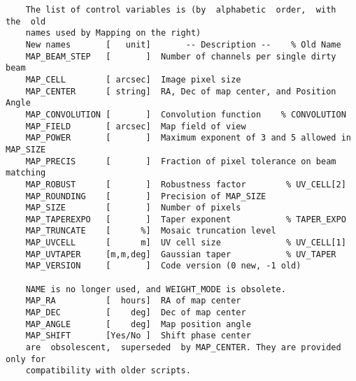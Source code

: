 \begin{verbatim}
    The list of control variables is (by  alphabetic  order,  with  the  old
    names used by Mapping on the right)
    New names       [   unit]       -- Description --    % Old Name
    MAP_BEAM_STEP   [       ]  Number of channels per single dirty beam
    MAP_CELL        [ arcsec]  Image pixel size
    MAP_CENTER      [ string]  RA, Dec of map center, and Position Angle
    MAP_CONVOLUTION [       ]  Convolution function    % CONVOLUTION
    MAP_FIELD       [ arcsec]  Map field of view
    MAP_POWER       [       ]  Maximum exponent of 3 and 5 allowed in MAP_SIZE
    MAP_PRECIS      [       ]  Fraction of pixel tolerance on beam matching
    MAP_ROBUST      [       ]  Robustness factor        % UV_CELL[2]
    MAP_ROUNDING    [       ]  Precision of MAP_SIZE
    MAP_SIZE        [       ]  Number of pixels
    MAP_TAPEREXPO   [       ]  Taper exponent           % TAPER_EXPO
    MAP_TRUNCATE    [      %]  Mosaic truncation level
    MAP_UVCELL      [      m]  UV cell size             % UV_CELL[1]
    MAP_UVTAPER     [m,m,deg]  Gaussian taper           % UV_TAPER
    MAP_VERSION     [       ]  Code version (0 new, -1 old)

    NAME is no longer used, and WEIGHT_MODE is obsolete.
    MAP_RA          [  hours]  RA of map center
    MAP_DEC         [    deg]  Dec of map center
    MAP_ANGLE       [    deg]  Map position angle
    MAP_SHIFT       [Yes/No ]  Shift phase center
    are  obsolescent,  superseded  by MAP_CENTER. They are provided only for
    compatibility with older scripts.
\end{verbatim}
